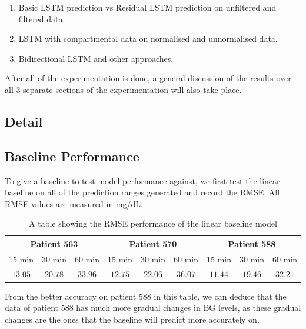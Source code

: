       \begin{enumerate}
        \item Basic LSTM prediction vs Residual LSTM prediction on unfiltered and filtered data.
        \item LSTM with compartmental data on normalised and unnormalised data.
        \item Bidirectional LSTM and other approaches.

      \end{enumerate}
	
      After all of the experimentation is done, a general discussion of the results over all 3 separate sections of the experimentation will also take place.

	\subsection{Detail}
    
    \subsection{Baseline Performance}

      To give a baseline to test model performance against, we first test the linear baseline on all of the prediction ranges generated and record the RMSE. All RMSE values are measured in mg/dL.

      \begin{table}[H]
        \centering
        \caption{A table showing the RMSE performance of the linear baseline model}
        \begin{tabular}{|*{9}{c|}} 
          \hline
          \multicolumn{3}{|c}{Patient 563} & \multicolumn{3}{|c}{Patient 570} & \multicolumn{3}{|c|}{Patient 588} \\ \hline 
          15 min & 30 min & 60 min &15 min & 30 min & 60 min &15 min & 30 min & 60 min \\ \hline
          $13.05$&$20.78$ &$33.96$ &$12.75$&$22.06$ &$36.07$ &$11.44$ &$19.46$ &$32.21$ \\ \hline
        \end{tabular}
      \end{table}

      From the better accuracy on patient 588 in this table, we can deduce that the data of patient 588 has much more gradual changes in BG levels, as these gradual changes are the ones that the baseline will predict more accurately on.

